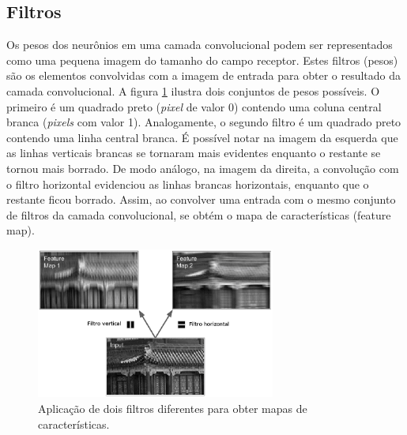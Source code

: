 \subsection{Filtros}
Os pesos dos neurônios em uma camada convolucional podem ser representados como uma pequena
imagem do tamanho do campo receptor. Estes filtros (pesos) são os elementos
convolvidas com a imagem de entrada para obter o resultado da camada convolucional.
A figura \ref{fig:conv_filt} ilustra dois conjuntos de pesos possíveis. O primeiro é um quadrado preto
(\textit{pixel} de valor 0) contendo uma coluna central branca (\textit{pixels} com valor 1). 
Analogamente, o segundo filtro é um quadrado preto contendo uma linha central branca.
É possível notar na imagem da esquerda que as linhas verticais brancas se tornaram mais evidentes enquanto o restante
se tornou mais borrado. De modo análogo, na imagem da direita, a convolução com o filtro horizontal evidenciou as linhas brancas horizontais, enquanto que
o restante ficou borrado. Assim, ao convolver uma entrada com o mesmo conjunto de filtros da camada convolucional, se obtém
o mapa de características (feature map).
\begin{figure}[htp]
\begin{center}
  \includegraphics[width=0.7\textwidth]{fig/conv_filt}
  \caption{Aplicação de dois filtros diferentes para obter mapas de características.}
  \label{fig:conv_filt}
\end{center}
\end{figure}


